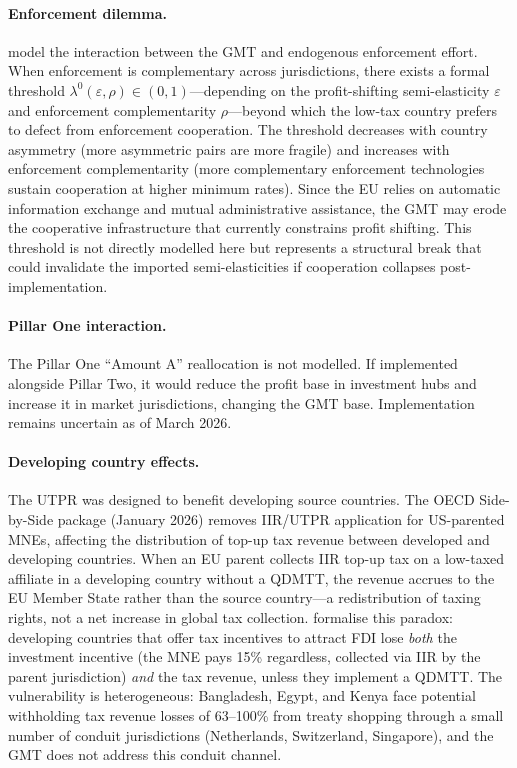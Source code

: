 \documentclass[11pt,a4paper]{article}
\begin{document}
\paragraph{Enforcement dilemma.} \citet{hindriks2025} model the interaction between the GMT and endogenous enforcement effort. When enforcement is complementary across jurisdictions, there exists a formal threshold $\lambda^0(\varepsilon, \rho) \in (0,1)$---depending on the profit-shifting semi-elasticity $\varepsilon$ and enforcement complementarity $\rho$---beyond which the low-tax country prefers to defect from enforcement cooperation. The threshold decreases with country asymmetry (more asymmetric pairs are more fragile) and increases with enforcement complementarity (more complementary enforcement technologies sustain cooperation at higher minimum rates). Since the EU relies on automatic information exchange and mutual administrative assistance, the GMT may erode the cooperative infrastructure that currently constrains profit shifting. This threshold is not directly modelled here but represents a structural break that could invalidate the imported semi-elasticities if cooperation collapses post-implementation.

\paragraph{Pillar One interaction.} The Pillar One ``Amount A'' reallocation is not modelled. If implemented alongside Pillar Two, it would reduce the profit base in investment hubs and increase it in market jurisdictions, changing the GMT base. Implementation remains uncertain as of March 2026.

\paragraph{Developing country effects.} The UTPR was designed to benefit developing source countries. The OECD Side-by-Side package (January 2026) removes IIR/UTPR application for US-parented MNEs, affecting the distribution of top-up tax revenue between developed and developing countries. When an EU parent collects IIR top-up tax on a low-taxed affiliate in a developing country without a QDMTT, the revenue accrues to the EU Member State rather than the source country---a redistribution of taxing rights, not a net increase in global tax collection. \citet{vantriet2025} formalise this paradox: developing countries that offer tax incentives to attract FDI lose \emph{both} the investment incentive (the MNE pays 15\% regardless, collected via IIR by the parent jurisdiction) \emph{and} the tax revenue, unless they implement a QDMTT. The vulnerability is heterogeneous: Bangladesh, Egypt, and Kenya face potential withholding tax revenue losses of 63--100\% from treaty shopping through a small number of conduit jurisdictions (Netherlands, Switzerland, Singapore), and the GMT does not address this conduit channel.
\end{document}
